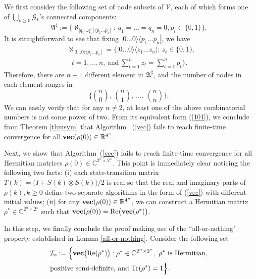 \documentclass[a4paper, 11pt]{article}
\begin{document}
 We first consider the following set of node subsets of $\mathcal{V}$,  each of which forms one of  $\bigcup_{k\geq 0}\mathcal{G}_k$'s connected components:
$$
\mathfrak{A}^\sharp:= \Big\{\aleph_{|q_1 \dots q_n\rangle \langle p_1 \dots p_n|}:\ q_1=\dots=q_n=0, p_i \in \{0,1\} \Big\}.
$$
It is straightforward to see that fixing $|0 \dots 0\rangle \langle p_1 \dots p_n|$, we have
\begin{align*}
&\aleph_{|0 \dots 0\rangle \langle p_1 \dots p_n|}=\Big\{ |0 \dots 0\rangle \langle z_1 \dots z_n|: \ z_t\in \{0,1\}, \\
 &\ \ \ t=1,\dots,n, \ \mbox{and}\ \sum_{t=1}^n z_t = \sum_{t=1}^n p_t\Big\}.
\end{align*}
Therefore, there are $n+1$ different element in $\mathfrak{A}^\sharp$, and the number of nodes in each element ranges in
$$
\Bigg \{ \binom{n}{0},\ \binom{n}{1},\ \dots,\ \binom{n}{n} \Bigg \}.
$$
We can easily verify that for any $n\neq 2$,  at least one of the above combinatorial numbers is not some power of two. From its equivalent form (\ref{101}), we conclude from Theorem \ref{thmsym} that Algorithm~ (\ref{vec}) fails to reach finite-time convergence for all ${ \rm \bf vec} (\rho(0)) \in \mathbb{R}^{4^n}$.

 Next, we show that  Algorithm~(\ref{vec}) fails to reach finite-time convergence for all Hermitian matrices $\rho(0) \in \mathbb{C}^{2^n \times 2^n}$. This point is immediately  clear noticing the following two facts: (i) each state-transition matrix $T(k)=\big(I+ S(k)\otimes S(k) \big)/2$ is real so that the real and imaginary parts of $\rho(k), k\geq 0$ define two separate  algorithms in the form of (\ref{vec}) with different initial values; (ii) for any ${ \rm \bf vec} (\rho(0)) \in \mathbb{R}^{4^n}$, we can construct a Hermitian matrix $\rho^* \in \mathbb{C}^{2^n \times 2^n}$ such that ${ \rm \bf vec} (\rho(0))={\rm Re} \big({ \rm \bf vec} (\rho^*)\big)$.

 In this step, we finally conclude the proof making use of the ``all-or-nothing" property established in Lemma \ref{all-or-nothing}. Consider the following set
\begin{align*}
&\mathcal{I}_o:=\Big\{ { \rm \bf vec}\big({\rm Re} (\rho^\ast)\big):  \rho^\ast \in \mathbb{C}^{2^n\times 2^n},\ \rho^\ast\ \mbox{is Hermitian,}\\
&\mbox{positive semi-definite, and}\  {\rm Tr}(\rho^\ast)=1\Big\}.
\end{align*}
\end{document}
